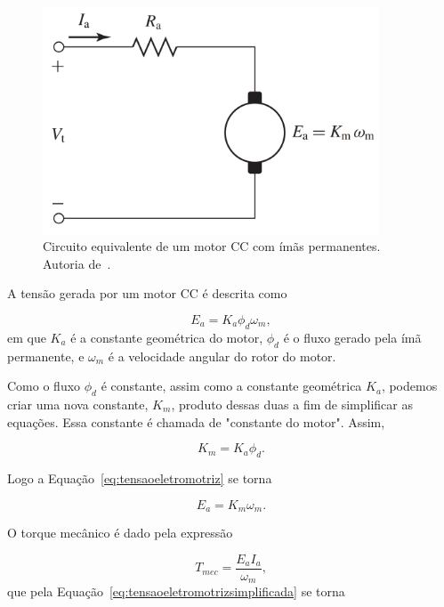         \begin{figure}[h]
            \centering
            \includegraphics[width=10cm]{Imagens/Circuito_eq.png}
            \caption{Circuito equivalente de um motor CC com ímãs permanentes. Autoria de~\cite{book:fitzgerald}.}
            \label{img:circuito}
        \end{figure}
	    
	    A tensão gerada por um motor CC é descrita como
	    
		\begin{equation}
		    E_a = K_a \phi_d \omega_m ,
		    \label{eq:tensaoeletromotriz}
		\end{equation}
		em que $K_a$ é a constante geométrica do motor, $\phi_d$ é o fluxo gerado pela ímã permanente, e $\omega_m$ é a velocidade angular do rotor do motor.
		
		Como o fluxo $\phi_d$ é constante, assim como a constante geométrica $K_a$, podemos criar uma nova constante, $K_m$, produto dessas duas a fim de simplificar as equações. Essa constante é chamada de "constante do motor". Assim,
		
		\begin{equation}
		    K_m = K_a \phi_d.
		\end{equation}
		
		Logo a Equação~\eqref{eq:tensaoeletromotriz} se torna
		
		\begin{equation}
            E_a = K_m \omega_m.
            \label{eq:tensaoeletromotrizsimplificada}
		\end{equation}
		
		O torque mecânico é dado pela expressão
		
		\begin{equation}
		    T_{mec} = \frac{E_a I_a}{\omega_m},
		\end{equation}
		que pela Equação~\eqref{eq:tensaoeletromotrizsimplificada} se torna
		
